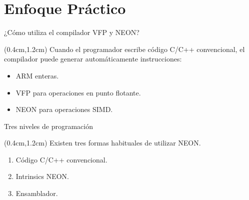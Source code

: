 
\section{Enfoque Práctico}


\begin{frame}{¿Cómo utiliza el compilador VFP y NEON?}
 \begin{textblock*}{\textwidth}(0.4cm,1.2cm)
  Cuando el programador escribe código C/C++ convencional, el compilador puede generar automáticamente instrucciones:
  \vspace{0.3cm}
  \begin{itemize}[<+(1)->]\justifying \parskip 0.2cm
   \item ARM enteras.
   \item VFP para operaciones en punto flotante.
   \item NEON para operaciones SIMD.
  \end{itemize}
  \vspace{0.4cm}
 \end{textblock*}
\end{frame}


\begin{frame}{Tres niveles de programación}
 \begin{textblock*}{\textwidth}(0.4cm,1.2cm)
  Existen tres formas habituales de utilizar NEON.
  \vspace{0.5cm}
  \begin{enumerate}[<+(1)->]
   \item Código C/C++ convencional.
   \item Intrinsics NEON.
   \item Ensamblador.
  \end{enumerate}
  \vspace{0.5cm}
 \end{textblock*}
\end{frame}

